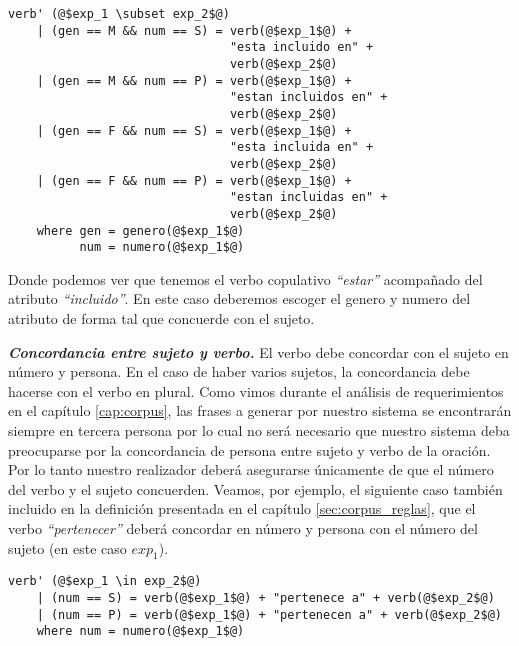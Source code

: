 \begin{mdframed}[style=codebox]
\begin{verbatim}
verb' (@$exp_1 \subset exp_2$@)
    | (gen == M && num == S) = verb(@$exp_1$@) + 
                               "esta incluido en" + 
                               verb(@$exp_2$@) 
    | (gen == M && num == P) = verb(@$exp_1$@) + 
                               "estan incluidos en" + 
                               verb(@$exp_2$@) 
    | (gen == F && num == S) = verb(@$exp_1$@) + 
                               "esta incluida en" + 
                               verb(@$exp_2$@) 
    | (gen == F && num == P) = verb(@$exp_1$@) + 
                               "estan incluidas en" + 
                               verb(@$exp_2$@) 
    where gen = genero(@$exp_1$@)
          num = numero(@$exp_1$@)
\end{verbatim}
\end{mdframed}

\noindent
Donde podemos ver que tenemos el verbo copulativo \emph{``estar''} acompañado del atributo \emph{``incluido''}. En este caso deberemos escoger el genero y numero del atributo de forma tal que concuerde con el sujeto.

\medskip
\noindent
\textbf{\emph{Concordancia entre sujeto y verbo.}} El verbo debe concordar con el sujeto en número y persona. En el caso de haber varios sujetos, la concordancia debe hacerse con el verbo en plural. Como vimos durante el análisis de requerimientos en el capítulo \ref{cap:corpus}, las frases a generar por nuestro sistema se encontrarán siempre en tercera persona por lo cual no será necesario que nuestro sistema deba preocuparse por la concordancia de persona entre sujeto y verbo de la oración. Por lo tanto nuestro realizador deberá asegurarse únicamente de que el número del verbo y el sujeto concuerden.
\noindent
Veamos, por ejemplo, el siguiente caso también incluido en la definición presentada en el capítulo \ref{sec:corpus_reglas}, que el verbo \emph{``pertenecer''} deberá concordar en número y persona con el número del sujeto (en este caso $exp_1$). 

\begin{mdframed}[style=codebox]
\begin{verbatim}
verb' (@$exp_1 \in exp_2$@)
    | (num == S) = verb(@$exp_1$@) + "pertenece a" + verb(@$exp_2$@) 
    | (num == P) = verb(@$exp_1$@) + "pertenecen a" + verb(@$exp_2$@) 
    where num = numero(@$exp_1$@)
\end{verbatim}
\end{mdframed}

